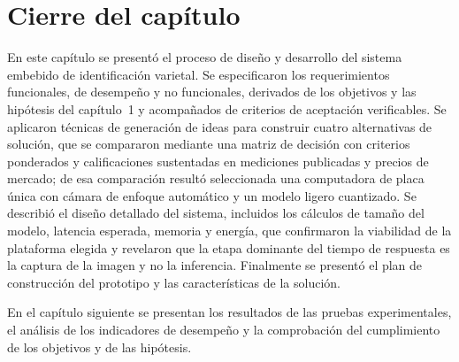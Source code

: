 \section*{Cierre del capítulo}

En este capítulo se presentó el proceso de diseño y desarrollo del sistema
embebido de identificación varietal. Se especificaron los requerimientos
funcionales, de desempeño y no funcionales, derivados de los objetivos y las
hipótesis del capítulo~1 y acompañados de criterios de aceptación
verificables. Se aplicaron técnicas de generación de ideas para construir
cuatro alternativas de solución, que se compararon mediante una matriz de
decisión con criterios ponderados y calificaciones sustentadas en mediciones
publicadas y precios de mercado; de esa comparación resultó seleccionada una
computadora de placa única con cámara de enfoque automático y un modelo
ligero cuantizado. Se describió el diseño detallado del sistema, incluidos los
cálculos de tamaño del modelo, latencia esperada, memoria y energía, que
confirmaron la viabilidad de la plataforma elegida y revelaron que la etapa
dominante del tiempo de respuesta es la captura de la imagen y no la
inferencia. Finalmente se presentó el plan de construcción del prototipo y
las características de la solución.

En el capítulo siguiente se presentan los resultados de las pruebas
experimentales, el análisis de los indicadores de desempeño y la
comprobación del cumplimiento de los objetivos y de las hipótesis.
